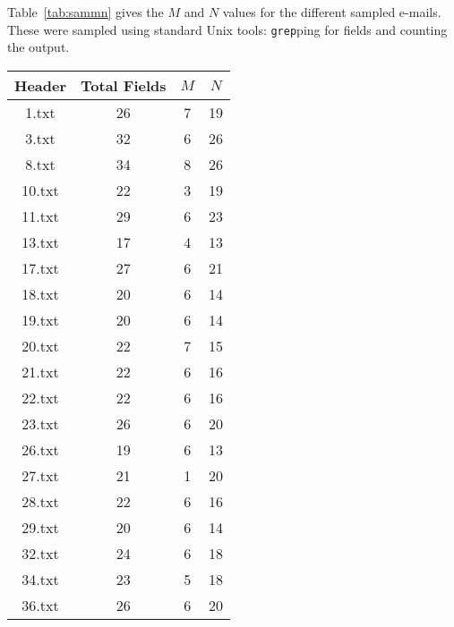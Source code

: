 Table~\ref{tab:sammn} gives the $M$ and $N$ values for the different sampled
e-mails.  These were sampled using standard Unix tools: \texttt{grep}ping for
fields and counting the output.

\begin{table}
\centering
\begin{tabular}{@{}cccc@{}}
\toprule
Header & Total Fields & $M$ & $N$ \\ \midrule
1.txt  & 26           & 7                     & 19                 \\
3.txt  & 32           & 6                     & 26                 \\
8.txt  & 34           & 8                     & 26                 \\
10.txt & 22           & 3                     & 19                 \\
11.txt & 29           & 6                     & 23                 \\
13.txt & 17           & 4                     & 13                 \\
17.txt & 27           & 6                     & 21                 \\
18.txt & 20           & 6                     & 14                 \\
19.txt & 20           & 6                     & 14                 \\
20.txt & 22           & 7                     & 15                 \\
21.txt & 22           & 6                     & 16                 \\
22.txt & 22           & 6                     & 16                 \\
23.txt & 26           & 6                     & 20                 \\
26.txt & 19           & 6                     & 13                 \\
27.txt & 21           & 1                     & 20                 \\
28.txt & 22           & 6                     & 16                 \\
29.txt & 20           & 6                     & 14                 \\
32.txt & 24           & 6                     & 18                 \\
34.txt & 23           & 5                     & 18                 \\
36.txt & 26           & 6                     & 20                 \\

\end{tabular}
\end{table}
